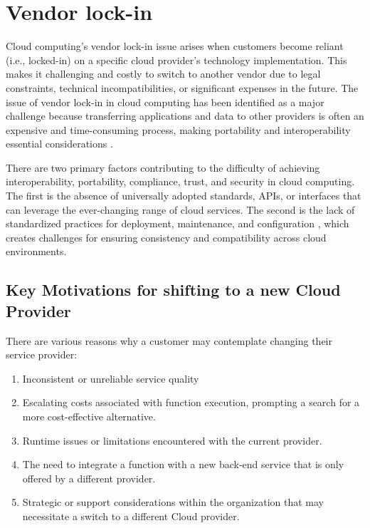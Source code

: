 \chapter{Vendor lock-in}
\label{chap:vendor-lock-in}

Cloud computing's vendor lock-in issue arises when customers become reliant (i.e., locked-in) on a specific cloud provider's technology implementation. This makes it challenging and costly to switch to another vendor due to legal constraints, technical incompatibilities, or significant expenses in the future. The issue of vendor lock-in in cloud computing has been identified as a major challenge because transferring applications and data to other providers is often an expensive and time-consuming process, making portability and interoperability essential considerations \cite{guest_2013_oracle}.

There are two primary factors contributing to the difficulty of achieving interoperability, portability, compliance, trust, and security in cloud computing. The first is the absence of universally adopted standards, APIs, or interfaces that can leverage the ever-changing range of cloud services. The second is the lack of standardized practices for deployment, maintenance, and configuration \cite{oparamartins_2014_critical}, which creates challenges for ensuring consistency and compatibility across cloud environments. 

\section{Key Motivations for shifting to a new Cloud Provider}
There are various reasons why a customer may contemplate changing their service provider:

\begin{enumerate}
    \item Inconsistent or unreliable service quality
    \item Escalating costs associated with function execution, prompting a search for a more cost-effective alternative.
    \item Runtime issues or limitations encountered with the current provider.
    \item The need to integrate a function with a new back-end service that is only offered by a different provider.
    \item Strategic or support considerations within the organization that may necessitate a switch to a different Cloud provider.
\end{enumerate}

